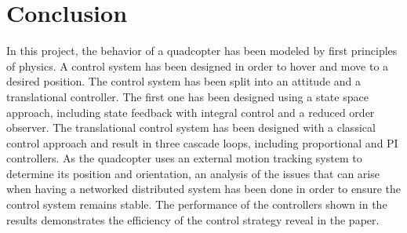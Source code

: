 \section{Conclusion}
In this project, the behavior of a quadcopter has been modeled by first principles of physics. A control system has been designed in order to hover and move to a desired position.
The control system has been split into an attitude and a translational controller. The first one has been designed using a state space approach, including state feedback with integral control and a reduced order observer. The translational control system has been designed with a classical control approach and result in three cascade loops, including proportional and PI controllers. 
As the quadcopter uses an external motion tracking system to determine its position and orientation, an analysis of the issues that can arise when having a networked distributed system has been done in order to ensure the control system remains stable. The performance of the controllers shown in the results demonstrates the efficiency of the control strategy reveal in the paper.

